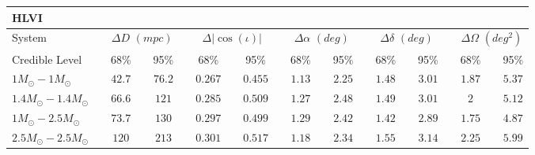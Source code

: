 \documentclass[11pt,a4paper]{emulateapj} 
\begin{document}
\begin{table}[h!]
{\begin{tabular}{lcccccccccccccccccccc}
\\HLVI\\ 
\hline\hline System & \vline & \multicolumn{3}{c}{$\Delta D$ $(mpc)$} & \vline &
\multicolumn{3}{c}{$\Delta |\cos(\iota)|$} & \vline & \multicolumn{3}{c}{$\Delta \alpha$ $(deg)$} & \vline &
\multicolumn{3}{c}{$\Delta \delta$ $(deg)$} & \vline & \multicolumn{3}{c}{$\Delta\Omega$
$(deg^2)$}\\\hline
Credible Level & \vline & 68\% & \vline & 95\% & \vline & 68\% & \vline & 95\% & \vline & 68\% & \vline & 95\% & \vline & 68\% & \vline & 95\% & \vline & 68\% & \vline & 95\% \\
 \hline\hline 
$1M_{\odot}-1M_{\odot}$ & \vline &$42.7$ & \vline &$76.2$ & \vline & $0.267$ & \vline &$0.455$ & \vline & $1.13$ & \vline &$2.25$ & \vline & $1.48$ & \vline &$3.01$ & \vline & $1.87$ & \vline &$5.37$\\\hline$1.4M_{\odot}-1.4M_{\odot}$ & \vline &$66.6$ & \vline &$121$ & \vline & $0.285$ & \vline &$0.509$ & \vline & $1.27$ & \vline &$2.48$ & \vline & $1.49$ & \vline &$3.01$ & \vline & $2$ & \vline &$5.12$\\\hline$1M_{\odot}-2.5M_{\odot}$ & \vline &$73.7$ & \vline &$130$ & \vline & $0.297$ & \vline &$0.499$ & \vline & $1.29$ & \vline &$2.42$ & \vline & $1.42$ & \vline &$2.89$ & \vline & $1.75$ & \vline &$4.87$\\\hline$2.5M_{\odot}-2.5M_{\odot}$ & \vline &$120$ & \vline &$213$ & \vline & $0.301$ & \vline &$0.517$ & \vline & $1.18$ & \vline &$2.34$ & \vline & $1.55$ & \vline &$3.14$ & \vline & $2.25$ & \vline &$5.99$\\ \hline

\end{tabular}}
\label{ciTableExtrinsic}
\end{table}
\end{document}
